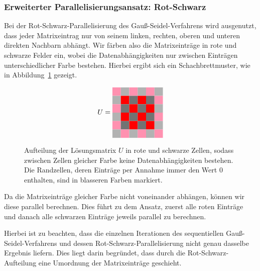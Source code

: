 \documentclass{article}
\begin{document}
\subsubsection{Erweiterter Parallelisierungsansatz: Rot-Schwarz}

Bei der Rot-Schwarz-Parallelisierung des Gauß-Seidel-Verfahrens wird ausgenutzt, dass jeder Matrixeintrag nur von seinem linken, rechten, oberen und unteren direkten Nachbarn abhängt. Wir färben also die Matrixeinträge in rote und schwarze Felder ein, wobei die Datenabhängigkeiten nur zwischen Einträgen unterschiedlicher Farbe bestehen. Hierbei ergibt sich ein Schachbrettmuster, wie in Abbildung~\ref{fig:matrix} gezeigt.

\begin{figure}[h!]
\centering
$$U = 
\begin{tabular}{cccccc}
  \cellcolor{rose} & \cellcolor[gray]{0.7} & \cellcolor{rose} & \cellcolor[gray]{0.7} & \cellcolor{rose} & \cellcolor[gray]{0.7}\\
 \cellcolor[gray]{0.7} & \cellcolor{red} & \cellcolor[gray]{0.45} & \cellcolor{red} & \cellcolor[gray]{0.45} & \cellcolor{rose}\\
  \cellcolor{rose} & \cellcolor[gray]{0.45} & \cellcolor{red} & \cellcolor[gray]{0.45} & \cellcolor{red} & \cellcolor[gray]{0.7}\\
 \cellcolor[gray]{0.7} & \cellcolor{red} & \cellcolor[gray]{0.45} & \cellcolor{red} & \cellcolor[gray]{0.45} & \cellcolor{rose} \\
 \cellcolor{rose} & \cellcolor[gray]{0.45} & \cellcolor{red} & \cellcolor[gray]{0.45} & \cellcolor{red} & \cellcolor[gray]{0.7}\\
 \cellcolor[gray]{0.7} & \cellcolor{rose} & \cellcolor[gray]{0.7} & \cellcolor{rose} & \cellcolor[gray]{0.7} & \cellcolor{rose}\\
\end{tabular}
$$
\caption{Aufteilung der Lösungsmatrix $U$ in rote und schwarze Zellen, sodass zwischen Zellen gleicher Farbe keine Datenabhängigkeiten bestehen. Die Randzellen, deren Einträge per Annahme immer den Wert $0$ enthalten, sind in blasseren Farben markiert.}
\label{fig:matrix}
\end{figure}

Da die Matrixeinträge gleicher Farbe nicht voneinander abhängen, können wir diese parallel berechnen. Dies führt zu dem Ansatz, zuerst alle roten Einträge und danach alle schwarzen Einträge jeweils parallel zu berechnen.

Hierbei ist zu beachten, dass die einzelnen Iterationen des sequentiellen Gauß-Seidel-Verfahrens und dessen Rot-Schwarz-Parallelisierung nicht genau dasselbe Ergebnis liefern. Dies liegt darin begründet, dass durch die Rot-Schwarz-Aufteilung eine Umordnung der Matrixeinträge geschieht.
\end{document}
